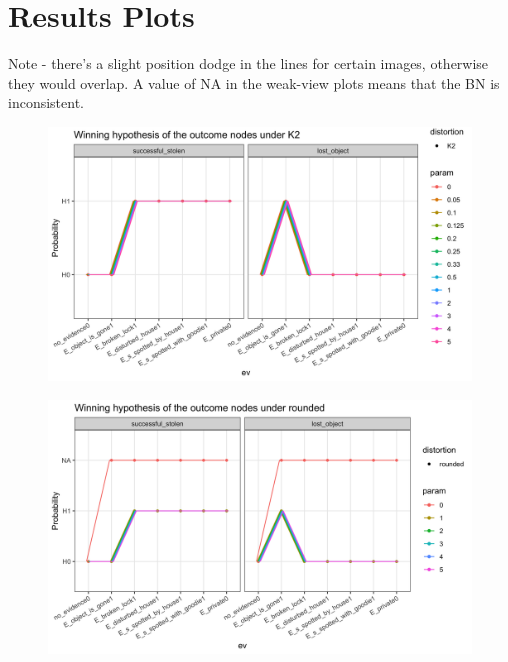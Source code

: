 \documentclass[11pt]{amsart}
\begin{document}
\section{Results Plots}
 \tiny{Note - there's a slight position dodge in the lines for certain images, otherwise they would overlap. A value of NA in the weak-view plots means that the BN is inconsistent.}
\begin{figure}[htbp]
\begin{center}
\includegraphics[scale=0.15]{images/K2Weak.png}
\label{default}
\end{center}
\end{figure}
\begin{figure}[htbp]
\begin{center}
\includegraphics[scale=0.15]{images/roundedWeak.png}
\label{default}
\end{center}
\end{figure}
\end{document}
